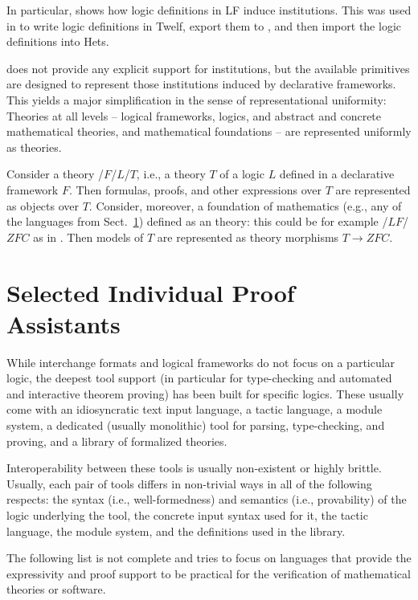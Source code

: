 \documentclass[12pt]{article}
\begin{document}
In particular, \cite{rabe:combining:10} shows how logic definitions in LF induce institutions.
This was used in \cite{CHKMRS:lfhets:11} to write logic definitions in Twelf, export them to \mmt, and then import the logic definitions into Hets.

\mmt does not provide any explicit support for institutions, but the available primitives are designed to represent those institutions induced by declarative frameworks.
This yields a major simplification in the sense of representational uniformity: Theories at all levels -- logical frameworks, logics, and abstract and  concrete mathematical theories, and mathematical foundations -- are represented uniformly as \mmt theories.

Consider a theory \mmt/$F$/$L$/$T$, i.e., a theory $T$ of a logic $L$ defined in a declarative framework $F$.
Then formulas, proofs, and other expressions over $T$ are represented as \mmt objects over $T$.
Consider, moreover, a foundation of mathematics (e.g., any of the languages from Sect.~\ref{sec:foundations}) defined as an \mmt theory: this could be for example \mmt/$LF$/$ZFC$ as in \cite{IR:foundations-lf:10}.
Then models of $T$ are represented as \mmt theory morphisms $T\to ZFC$.

\section{Selected Individual Proof Assistants}\label{sec:foundations}

While interchange formats and logical frameworks do not focus on a particular logic, the deepest tool support (in particular for type-checking and automated and interactive theorem proving) has been built for specific logics.
These usually come with an idiosyncratic text input language, a tactic language, a module system, a dedicated (usually monolithic) tool for parsing, type-checking, and proving, and a library of formalized theories.

Interoperability between these tools is usually non-existent or highly brittle.
Usually, each pair of tools differs in non-trivial ways in all of the following respects: the syntax (i.e., well-formedness) and semantics (i.e., provability) of the logic underlying the tool, the concrete input syntax used for it, the tactic language, the module system, and the definitions used in the library.

The following list is not complete and tries to focus on languages that provide the expressivity and proof support to be practical for the verification of mathematical theories or software.
\end{document}

